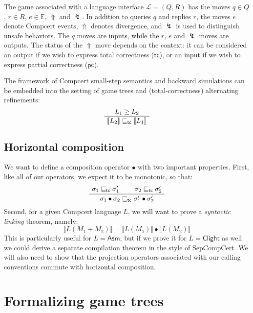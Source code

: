 \documentclass{article}
\newcommand{\kw}[1]{{\mathsf{#1}}}
\begin{document}
The game associated with a language interface $\mathcal{L} = (Q, R)$
has the moves
$q \in Q$, $r \in R$, $e \in \mathbb{E}$, $\Uparrow$ and $\lightning$.
In addition to queries $q$ and replies $r$,
the moves $e$ denote Compcert events,
$\Uparrow$ denotes divergence,
and $\lightning$ is used to distinguish unsafe behaviors.
The $q$ moves are inputs,
while the $r$, $e$ and $\lightning$ moves are outputs.
The status of the $\Uparrow$ move depends on the context:
it can be considered
an output if we wish to express total correctness ($\kw{tc}$), or
an input if we wish to express partial correctness ($\kw{pc}$).

The framework of
Compcert small-step semantics and backward simulations
can be embedded into
the setting of game trees and (total-correctness) alternating refinements:
\begin{equation}
  \AxiomC{$L_1 \ge L_2$}
  \UnaryInfC{$\llbracket L_2 \rrbracket \sqsubseteq_\kw{tc} \llbracket L_1 \rrbracket$}
  \DisplayProof
  \label{eqn:hcompm}
\end{equation}

\subsection{Horizontal composition}

We want to define a composition operator $\bullet$
with two important properties.
First, like all of our operators,
we expect it to be monotonic, so that:
\begin{equation}
  \AxiomC{$\sigma_1 \sqsubseteq_\kw{tc} \sigma_1'$}
  \AxiomC{$\sigma_2 \sqsubseteq_\kw{tc} \sigma_2'$}
  \BinaryInfC{$\sigma_1 \bullet \sigma_2 \sqsubseteq_\kw{tc}
                \sigma_1' \bullet \sigma_2'$}
  \DisplayProof
  \label{eqn:embed}
\end{equation}
Second,
for a given Compcert language $L$,
we will want to prove a \emph{syntactic linking} theorem,
namely:
\begin{equation}
  \llbracket L(M_1 + M_2) \rrbracket =
  \llbracket L(M_1) \rrbracket \bullet
  \llbracket L(M_2) \rrbracket
  \label{eqn:slink}
\end{equation}
This is particularly useful for $L = \kw{Asm}$,
but if we prove it for $L = \kw{Clight}$ as well
we could derive a separate compilation theorem
in the style of SepCompCert.
We will also need to show that the projection operators
associated with our calling conventions
commute with horizontal composition.

\section{Formalizing game trees}
\end{document}

